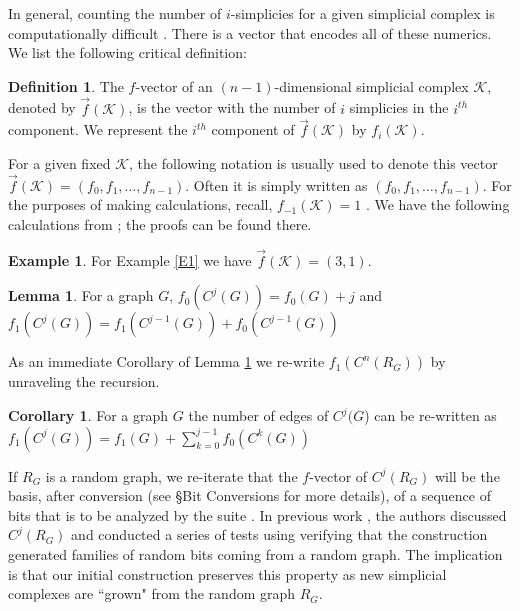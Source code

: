 \documentclass[oneside,12pt]{amsart}
\theoremstyle{definition}
\newtheorem{Definition}[Theorem]{Definition}
\newtheorem{Lemma}[Theorem]{Lemma}
\newtheorem{Corollary}[Theorem]{Corollary}
\newtheorem{Example}[Theorem]{Example}
\numberwithin{equation}{section}
\begin{document}
In general, counting the number of $i$-simplicies for a given simplicial complex is computationally difficult \cite{KP}.  There is a vector that encodes all of these numerics.  We list the following critical definition:

\begin{Definition}\label{fvector}
The $f$-vector of an $(n-1)$-dimensional simplicial complex $\mathcal{K}$, denoted by $\overrightarrow{f}(\mathcal{K})$, is the vector with the number of $i$ simplicies in the $i^{th}$ component. We represent the $i^{th}$ component of $\overrightarrow{f}(\mathcal{K})$ by $f_{i}(\mathcal{K})$.
\end{Definition}

For a given fixed $\mathcal{K}$, the following notation is usually used to denote this vector $\overrightarrow{f}(\mathcal{K}) = (f_0,f_1,\ldots,f_{n-1})$. Often it is simply written as $(f_0,f_1,\ldots,f_{n-1})$. For the purposes of making calculations, recall, $f_{-1}(\mathcal{K}) = 1$ \cite{BP1}.  We have the following calculations from \cite{ALDH}; the proofs can be found there.

\begin{Example}
For Example \ref{E1} we have $\overrightarrow{f}(\mathcal{K})=(3,1)$.
\end{Example}

\begin{Lemma} \label{Count on Cone}
For a graph $G$, $f_0(C^j(G)) = f_0(G) + j$ and $f_1(C^j(G)) =  f_1(C^{j-1}(G)) +  f_0(C^{j-1}(G))$
\end{Lemma}

As an immediate Corollary of Lemma \ref{Count on Cone} we re-write $f_1(C^n(R_G))$ by unraveling the recursion.

\begin{Corollary}\label{recursion}
For a graph $G$ the number of edges of $C^j(G$) can be re-written as $f_1(C^j(G)) = f_1(G) + \sum_{k = 0}^ {j-1} f_0(C^k(G))$
\end{Corollary}

If $R_G$ is a random graph, we re-iterate that the $f$-vector of $C^j(R_G)$ will be the basis, after conversion (see \S Bit Conversions for more details), of  a sequence of bits that is to be analyzed by the suite \cite{NIST}.  In previous work \cite{ALDH}, the authors discussed $C^j(R_G)$ and conducted a series of tests using \cite{NIST} verifying that the construction generated families of random bits coming from a random graph.  The implication is that our initial construction preserves this property as new simplicial complexes are ``grown" from the random graph $R_G$.
\end{document}
